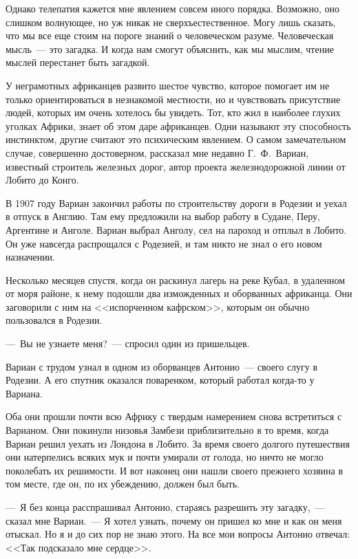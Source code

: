 \documentclass[12pt,a4paper,twoside,openany,svgnames]{memoir}
\begin{document}
Однако телепатия кажется мне явлением совсем иного порядка. Возможно, оно слишком волнующее, но уж никак не сверхъестественное. Могу лишь сказать, что мы все еще стоим на пороге знаний о человеческом разуме. Человеческая мысль~--- это загадка. И когда нам смогут объяснить, как мы мыслим, чтение мыслей перестанет быть загадкой.

У неграмотных африканцев развито шестое чувство, которое помогает им не только ориентироваться в незнакомой местности, но и чувствовать присутствие людей, которых им очень хотелось бы увидеть. Тот, кто жил в наиболее глухих уголках Африки, знает об этом даре африканцев. Одни называют эту способность инстинктом, другие считают это психическим явлением. О самом замечательном случае, совершенно достоверном, рассказал мне недавно Г.~Ф.~Вариан, известный строитель железных дорог, автор проекта железнодорожной линии от Лобито до Конго.

В 1907 году Вариан закончил работы по строительству дороги в Родезии и уехал в отпуск в Англию. Там ему предложили на выбор работу в Судане, Перу, Аргентине и Анголе. Вариан выбрал Анголу, сел на пароход и отплыл в Лобито. Он уже навсегда распрощался с Родезией, и там никто не знал о его новом назначении.

Несколько месяцев спустя, когда он раскинул лагерь на реке Кубал, в удаленном от моря районе, к нему подошли два изможденных и оборванных африканца. Они заговорили с ним на <<испорченном кафрском>>, которым он обычно пользовался в Родезии.

---~Вы не узнаете меня?~--- спросил один из пришельцев.

Вариан с трудом узнал в одном из оборванцев Антонио~--- своего слугу в Родезии. А его спутник оказался поваренком, который работал когда-то у Вариана.

Оба они прошли почти всю Африку с твердым намерением снова встретиться с Варианом. Они покинули низовья Замбези приблизительно в то время, когда Вариан решил уехать из Лондона в Лобито. За время своего долгого путешествия они натерпелись всяких мук и почти умирали от голода, но ничто не могло поколебать их решимости. И вот наконец они нашли своего прежнего хозяина в том месте, где он, по их убеждению, должен был быть.

---~Я без конца расспрашивал Антонио, стараясь разрешить эту загадку,~--- сказал мне Вариан.~--- Я хотел узнать, почему он пришел ко мне и как он меня отыскал. Но я и до сих пор не знаю этого. На все мои вопросы Антонио отвечал: <<Так подсказало мне сердце>>.
\end{document}
